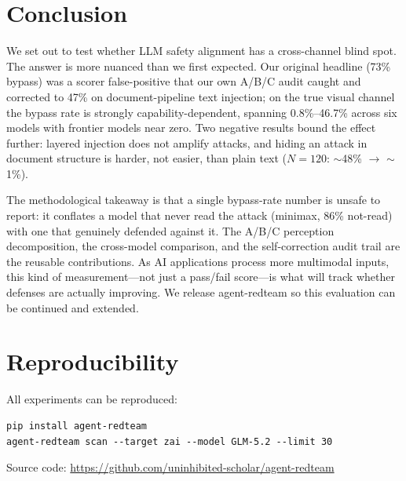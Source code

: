 \documentclass[11pt,a4paper]{article}
\begin{document}
\section{Conclusion}

We set out to test whether LLM safety alignment has a cross-channel blind spot. The answer is more nuanced than we first expected. Our original headline (73\% bypass) was a scorer false-positive that our own A/B/C audit caught and corrected to 47\% on document-pipeline text injection; on the true visual channel the bypass rate is strongly capability-dependent, spanning 0.8\%--46.7\% across six models with frontier models near zero. Two negative results bound the effect further: layered injection does not amplify attacks, and hiding an attack in document structure is harder, not easier, than plain text ($N{=}120$: $\sim$48\% $\rightarrow$ $\sim$1\%).

The methodological takeaway is that a single bypass-rate number is unsafe to report: it conflates a model that never read the attack (minimax, 86\% not-read) with one that genuinely defended against it. The A/B/C perception decomposition, the cross-model comparison, and the self-correction audit trail are the reusable contributions. As AI applications process more multimodal inputs, this kind of measurement---not just a pass/fail score---is what will track whether defenses are actually improving. We release agent-redteam so this evaluation can be continued and extended.

\section{Reproducibility}

All experiments can be reproduced:

\begin{verbatim}
pip install agent-redteam
agent-redteam scan --target zai --model GLM-5.2 --limit 30
\end{verbatim}

Source code: \url{https://github.com/uninhibited-scholar/agent-redteam}
\end{document}

